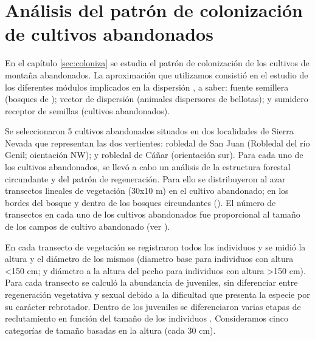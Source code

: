 \section{Análisis del patrón de colonización de cultivos abandonados}\label{sec:metodologia:coloniza}

En el capítulo \ref{sec:coloniza} se estudia el patrón de colonización de los cultivos de montaña abandonados. La aproximación que utilizamos consistió en el estudio de los diferentes módulos implicados en la dispersión \autocite[][]{LundbergMoberg2003MobileLink,Nathanetal2012DispersalKernels}, a saber: fuente semillera (bosques de \Qpy); vector de dispersión (animales dispersores de bellotas); y  sumidero receptor de semillas (cultivos abandonados).

Se seleccionaron 5 cultivos abandonados situados en dos localidades de Sierra Nevada que representan las dos vertientes: robledal de San Juan (Robledal del río Genil; oientación NW); y robledal de Cáñar (orientación sur). Para cada uno de los cultivos abandonados, se llevó a cabo un análisis de la estructura forestal circundante y del patrón de regeneración. Para ello se  distribuyeron al azar transectos lineales de vegetación (30x10 m) en el cultivo abandonado; en los bordes del bosque y dentro de los bosques circundantes (). El número de transectos en cada uno de los cultivos abandonados fue proporcional al tamaño de los campos de cultivo abandonado (ver ). 

En cada transecto de vegetación se registraron todos los individuos y se midió la altura y el diámetro de los mismos (diametro base para individuos con altura \textless 150 cm; y diámetro a la altura del pecho para individuos con altura \textgreater 150 cm). Para cada transecto se calculó la abundancia de juveniles, sin diferenciar entre regeneración vegetativa y sexual debido a la dificultad que presenta la especie por su carácter rebrotador. Dentro de los juveniles se diferenciaron varias etapas de reclutamiento en función del tamaño de los individuos \autocite[\emph{e.g.}][]{Plieningeretal2010LargeScalePatterns}. Consideramos cinco categorías de tamaño basadas en la altura (cada 30 cm). 

